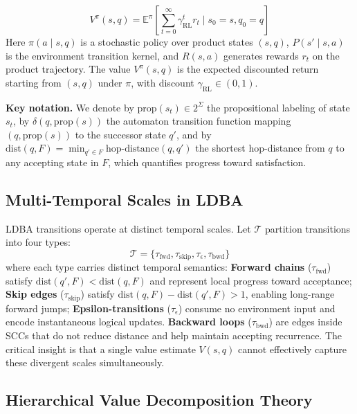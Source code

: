 \documentclass{article}
\begin{document}
\begin{equation}
V^\pi(s,q) = \mathbb{E}^\pi\left[\sum_{t=0}^\infty \gamma_{\text{RL}}^t r_t \mid s_0 = s, q_0 = q\right]
\label{eq:value_func}
\end{equation}
Here $\pi(a\mid s,q)$ is a stochastic policy over product states $(s,q)$, $P(s'\mid s,a)$ is the environment transition kernel, and $R(s,a)$ generates rewards $r_t$ on the product trajectory. The value $V^\pi(s,q)$ is the expected discounted return starting from $(s,q)$ under $\pi$, with discount $\gamma_{\text{RL}} \in (0,1)$.

\textbf{Key notation.} We denote by $\text{prop}(s_t) \in 2^\Sigma$ the propositional labeling of state $s_t$, by $\delta(q, \text{prop}(s))$ the automaton transition function mapping $(q, \text{prop}(s))$ to the successor state $q'$, and by $\text{dist}(q, F) = \min_{q' \in F} \text{hop-distance}(q, q')$ the shortest hop-distance from $q$ to any accepting state in $F$, which quantifies progress toward satisfaction.

\subsection{Multi-Temporal Scales in LDBA}

LDBA transitions operate at distinct temporal scales. Let $\mathcal{T}$ partition transitions into four types:
\begin{equation}
\mathcal{T} = \{\tau_{\text{fwd}}, \tau_{\text{skip}}, \tau_{\epsilon}, \tau_{\text{bwd}}\}
\label{eq:transition_types}
\end{equation}
where each type carries distinct temporal semantics: \textbf{Forward chains} ($\tau_{\text{fwd}}$) satisfy $\text{dist}(q', F) < \text{dist}(q, F)$ and represent local progress toward acceptance; \textbf{Skip edges} ($\tau_{\text{skip}}$) satisfy $\text{dist}(q, F) - \text{dist}(q', F) > 1$, enabling long-range forward jumps; \textbf{Epsilon-transitions} ($\tau_{\epsilon}$) consume no environment input and encode instantaneous logical updates. \textbf{Backward loops} ($\tau_{\text{bwd}}$) are edges inside SCCs that do not reduce distance and help maintain accepting recurrence. The critical insight is that a single value estimate $V(s, q)$ cannot effectively capture these divergent scales simultaneously.

\subsection{Hierarchical Value Decomposition Theory}
\end{document}
